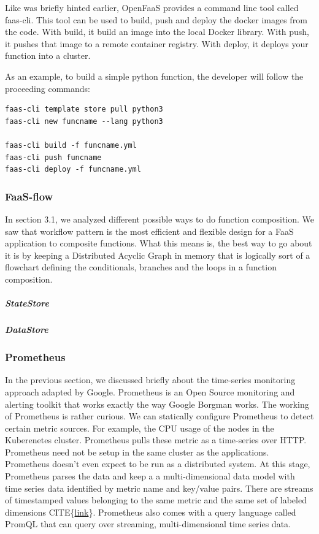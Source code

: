 \documentclass[12pt,titlepage]{article}
\begin{document}
Like was briefly hinted earlier, OpenFaaS provides a command line tool called
faas-cli. This tool can be used to build, push and deploy the docker images from
the code. With build, it build an image into the local Docker library. With
push, it pushes that image to a remote container registry. With deploy, it
deploys your function into a cluster.

As an example, to build a simple python function, the developer will follow the
proceeding commands:

\begin{lstlisting}
faas-cli template store pull python3
faas-cli new funcname --lang python3

faas-cli build -f funcname.yml
faas-cli push funcname
faas-cli deploy -f funcname.yml
\end{lstlisting}

\subsubsection{FaaS-flow}
\label{sec:orgd9de257}
In section 3.1, we analyzed different possible ways to do function composition.
We saw that workflow pattern is the most efficient and flexible design for a
FaaS application to composite functions. What this means is, the best way to go
about it is by keeping a Distributed Acyclic Graph in memory that is logically
sort of a flowchart defining the conditionals, branches and the loops in a
function composition.  
\subparagraph{StateStore}
\label{sec:org563646e}
\subparagraph{DataStore}
\label{sec:org1320b96}

\subsubsection{Prometheus}
\label{sec:org4d0a647}
In the previous section, we discussed briefly about the time-series monitoring
approach adapted by Google. Prometheus is an Open Source monitoring and alerting
toolkit that works exactly the way Google Borgman works. The working of
Prometheus is rather curious. We can statically configure Prometheus to detect
certain metric sources. For example, the CPU usage of the nodes in the
Kuberenetes cluster. Prometheus pulls these metric as a time-series over HTTP.
Prometheus need not be setup in the same cluster as the applications. Prometheus
doesn't even expect to be run as a distributed system. At this stage, Prometheus
parses the data and keep a a multi-dimensional data model with time series data
identified by metric name and key/value pairs. There are streams of timestamped
values belonging to the same metric and the same set of labeled dimensions
CITE\{\href{https://prometheus.io/docs/concepts/data\_model/}{link}\}. Prometheus also comes with a query language called PromQL that can
query over streaming, multi-dimensional time series data.
\end{document}
